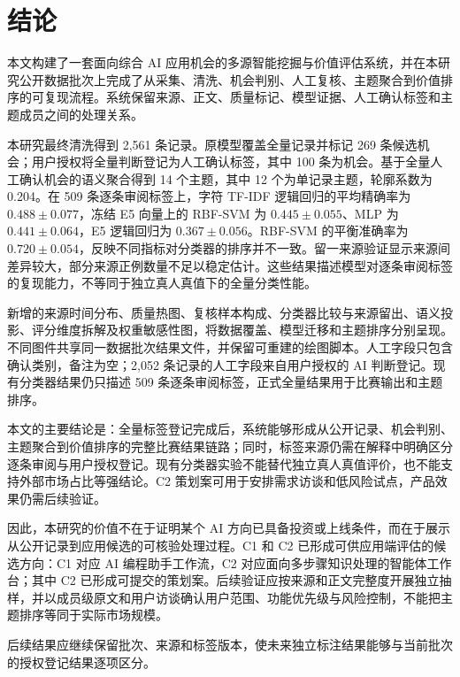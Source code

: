 \section{结论}

本文构建了一套面向综合 AI 应用机会的多源智能挖掘与价值评估系统，并在本研究公开数据批次上完成了从采集、清洗、机会判别、人工复核、主题聚合到价值排序的可复现流程。系统保留来源、正文、质量标记、模型证据、人工确认标签和主题成员之间的处理关系。

本研究最终清洗得到 2,561 条记录。原模型覆盖全量记录并标记 269 条候选机会；用户授权将全量判断登记为人工确认标签，其中 100 条为机会。基于全量人工确认机会的语义聚合得到 14 个主题，其中 12 个为单记录主题，轮廓系数为 0.204。在 509 条逐条审阅标签上，字符 TF-IDF 逻辑回归的平均精确率为 $0.488\pm0.077$，冻结 E5 向量上的 RBF-SVM 为 $0.445\pm0.055$、MLP 为 $0.441\pm0.064$，E5 逻辑回归为 $0.367\pm0.056$。RBF-SVM 的平衡准确率为 $0.720\pm0.054$，反映不同指标对分类器的排序并不一致。留一来源验证显示来源间差异较大，部分来源正例数量不足以稳定估计。这些结果描述模型对逐条审阅标签的复现能力，不等同于独立真人真值下的全量分类性能。

新增的来源时间分布、质量热图、复核样本构成、分类器比较与来源留出、语义投影、评分维度拆解及权重敏感性图，将数据覆盖、模型迁移和主题排序分别呈现。不同图件共享同一数据批次结果文件，并保留可重建的绘图脚本。人工字段只包含确认类别，备注为空；2,052 条记录的人工字段来自用户授权的 AI 判断登记。现有分类器结果仍只描述 509 条逐条审阅标签，正式全量结果用于比赛输出和主题排序。

本文的主要结论是：全量标签登记完成后，系统能够形成从公开记录、机会判别、主题聚合到价值排序的完整比赛结果链路；同时，标签来源仍需在解释中明确区分逐条审阅与用户授权登记。现有分类器实验不能替代独立真人真值评价，也不能支持外部市场占比等强结论。C2 策划案可用于安排需求访谈和低风险试点，产品效果仍需后续验证。

因此，本研究的价值不在于证明某个 AI 方向已具备投资或上线条件，而在于展示从公开记录到应用候选的可核验处理过程。C1 和 C2 已形成可供应用端评估的候选方向：C1 对应 AI 编程助手工作流，C2 对应面向多步骤知识处理的智能体工作台；其中 C2 已形成可提交的策划案。后续验证应按来源和正文完整度开展独立抽样，并以成员级原文和用户访谈确认用户范围、功能优先级与风险控制，不能把主题排序等同于实际市场规模。

后续结果应继续保留批次、来源和标签版本，使未来独立标注结果能够与当前批次的授权登记结果逐项区分。
